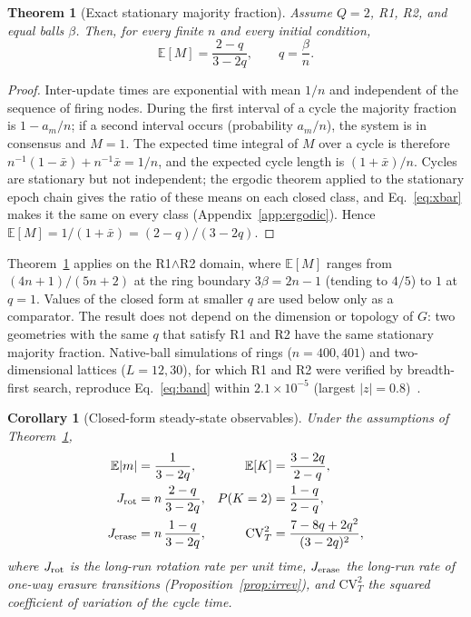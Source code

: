 \documentclass[aps,pre,reprint,superscriptaddress,amsmath,amssymb,longbibliography]{revtex4-2}
\newtheorem{theorem}{Theorem}
\newtheorem{corollary}{Corollary}
\theoremstyle{remark}
\newcommand{\E}{\mathbb{E}}
\begin{document}
\begin{theorem}[Exact stationary majority fraction]
\label{thm:band}
Assume $Q=2$, R1, R2, and equal balls $\beta$. Then, for every finite
$n$ and every initial condition,
\begin{equation}
\E[M]=\frac{2-q}{3-2q},\qquad q=\frac{\beta}{n}.
\label{eq:band}
\end{equation}
\end{theorem}

\begin{proof}
Inter-update times are exponential with mean $1/n$ and independent of the
sequence of firing nodes. During the first interval of a cycle the
majority fraction is $1-a_m/n$; if a second interval occurs
(probability $a_m/n$), the system is in consensus and $M=1$. The
expected time integral of $M$ over a cycle is therefore
$n^{-1}(1-\bar x)+n^{-1}\bar x=1/n$, and the expected cycle length is
$(1+\bar x)/n$. Cycles are stationary but not independent; the ergodic
theorem applied to the stationary epoch chain gives the ratio of these
means on each closed class, and Eq.~\eqref{eq:xbar} makes it the same on
every class (Appendix~\ref{app:ergodic}). Hence
$\E[M]=1/(1+\bar x)=(2-q)/(3-2q)$.
\end{proof}

Theorem~\ref{thm:band} applies on the R1$\wedge$R2 domain, where
$\E[M]$ ranges from $(4n+1)/(5n+2)$ at the ring boundary $3\beta=2n-1$
(tending to $4/5$) to $1$ at $q=1$. Values of the closed form at smaller
$q$ are used below only as a comparator. The result does not depend on
the dimension or topology of $G$: two geometries with the same $q$ that
satisfy R1 and R2 have the same stationary majority fraction. Native-ball
simulations of rings ($n=400,401$) and two-dimensional lattices
($L=12,30$), for which R1 and R2 were verified by breadth-first search,
reproduce Eq.~\eqref{eq:band} within $2.1\times10^{-5}$ (largest
$|z|=0.8$)~\cite{SM}.

\begin{corollary}[Closed-form steady-state observables]
\label{cor:observables}
Under the assumptions of Theorem~\ref{thm:band},
\begin{equation}
\begin{aligned}
\E|m|&=\frac{1}{3-2q}, & \E[K]&=\frac{3-2q}{2-q},\\
J_{\rm rot}&=n\,\frac{2-q}{3-2q}, & P(K=2)&=\frac{1-q}{2-q},\\
J_{\rm erase}&=n\,\frac{1-q}{3-2q}, & \mathrm{CV}_T^2&=\frac{7-8q+2q^2}{(3-2q)^2},
\end{aligned}
\label{eq:observables}
\end{equation}
where $J_{\rm rot}$ is the long-run rotation rate per unit time,
$J_{\rm erase}$ the long-run rate of one-way erasure transitions
(Proposition~\ref{prop:irrev}), and $\mathrm{CV}_T^2$ the squared
coefficient of variation of the cycle time.
\end{corollary}
\end{document}
